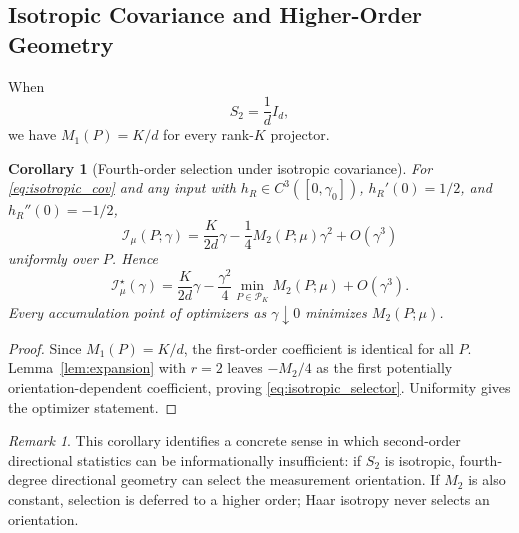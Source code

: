 \documentclass[lettersize,onecolumn]{IEEEtran}
\newtheorem{corollary}{Corollary}
\theoremstyle{remark}
\newtheorem{remark}{Remark}
\theoremstyle{definition}
\newcommand{\I}{\mathcal I}
\newcommand{\Pset}{\mathcal P_K}
\begin{document}
\subsection{Isotropic Covariance and Higher-Order Geometry}
When
\begin{equation}
S_2=\frac1d I_d,
\label{eq:isotropic_cov}
\end{equation}
we have $M_1(P)=K/d$ for every rank-$K$ projector.

\begin{corollary}[Fourth-order selection under isotropic covariance]\label{cor:fourth}
For \eqref{eq:isotropic_cov} and any input with $h_R\in C^3([0,\gamma_0])$, $h_R'(0)=1/2$, and $h_R''(0)=-1/2$,
\begin{equation}
\I_\mu(P;\gamma)
=\frac{K}{2d}\gamma-\frac{1}{4}M_2(P;\mu)\gamma^2+O(\gamma^3)
\end{equation}
uniformly over $P$. Hence
\begin{equation}
\I_\mu^\star(\gamma)
=\frac{K}{2d}\gamma-\frac{\gamma^2}{4}\min_{P\in\Pset}M_2(P;\mu)+O(\gamma^3).
\label{eq:isotropic_selector}
\end{equation}
Every accumulation point of optimizers as $\gamma\downarrow0$ minimizes $M_2(P;\mu)$.
\end{corollary}
\begin{proof}
Since $M_1(P)=K/d$, the first-order coefficient is identical for all $P$. Lemma~\ref{lem:expansion} with $r=2$ leaves $-M_2/4$ as the first potentially orientation-dependent coefficient, proving \eqref{eq:isotropic_selector}. Uniformity gives the optimizer statement.
\end{proof}

\begin{remark}
This corollary identifies a concrete sense in which second-order directional statistics can be informationally insufficient: if $S_2$ is isotropic, fourth-degree directional geometry can select the measurement orientation. If $M_2$ is also constant, selection is deferred to a higher order; Haar isotropy never selects an orientation.
\end{remark}




\end{document}

